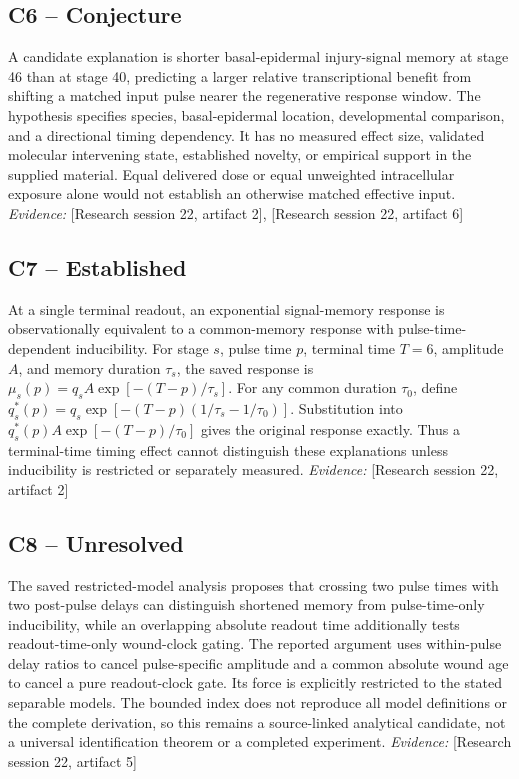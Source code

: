 \documentclass[11pt]{article}
\begin{document}
\begin{sloppypar}
\subsection{C6 -- Conjecture}
A candidate explanation is shorter basal-epidermal injury-signal memory at stage 46 than at stage 40, predicting a larger relative transcriptional benefit from shifting a matched input pulse nearer the regenerative response window.
The hypothesis specifies species, basal-epidermal location, developmental comparison, and a directional timing dependency. It has no measured effect size, validated molecular intervening state, established novelty, or empirical support in the supplied material. Equal delivered dose or equal unweighted intracellular exposure alone would not establish an otherwise matched effective input.
\textit{Evidence: }[Research session 22, artifact 2], [Research session 22, artifact 6]
\subsection{C7 -- Established}
At a single terminal readout, an exponential signal-memory response is observationally equivalent to a common-memory response with pulse-time-dependent inducibility.
For stage $s$, pulse time $p$, terminal time $T=6$, amplitude $A$, and memory duration $\tau_s$, the saved response is $\mu_s(p)=q_sA\exp[-(T-p)/\tau_s]$. For any common duration $\tau_0$, define $q_s^*(p)=q_s\exp[-(T-p)(1/\tau_s-1/\tau_0)]$. Substitution into $q_s^*(p)A\exp[-(T-p)/\tau_0]$ gives the original response exactly. Thus a terminal-time timing effect cannot distinguish these explanations unless inducibility is restricted or separately measured.
\textit{Evidence: }[Research session 22, artifact 2]
\subsection{C8 -- Unresolved}
The saved restricted-model analysis proposes that crossing two pulse times with two post-pulse delays can distinguish shortened memory from pulse-time-only inducibility, while an overlapping absolute readout time additionally tests readout-time-only wound-clock gating.
The reported argument uses within-pulse delay ratios to cancel pulse-specific amplitude and a common absolute wound age to cancel a pure readout-clock gate. Its force is explicitly restricted to the stated separable models. The bounded index does not reproduce all model definitions or the complete derivation, so this remains a source-linked analytical candidate, not a universal identification theorem or a completed experiment.
\textit{Evidence: }[Research session 22, artifact 5]

\end{sloppypar}
\end{document}
